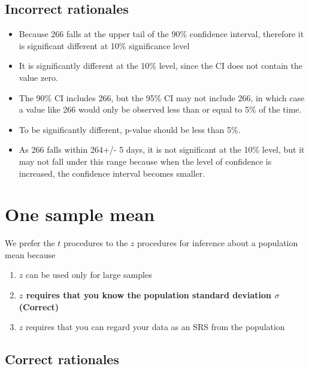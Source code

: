 \documentclass[letterpaper,9pt,twoside,printwatermark=false]{pinp}
\providecommand{\tightlist}{%
  \setlength{\itemsep}{0pt}\setlength{\parskip}{0pt}}
\begin{document}
\subsection{Incorrect rationales}\label{incorrect-rationales-3}

\begin{itemize}
\tightlist
\item
  Because 266 falls at the upper tail of the 90\% confidence interval,
  therefore it is significant different at 10\% significance level
\item
  It is significantly different at the 10\% level, since the CI does not
  contain the value zero.
\item
  The 90\% CI includes 266, but the 95\% CI may not include 266, in
  which case a value like 266 would only be observed less than or equal
  to 5\% of the time.
\item
  To be significantly different, p-value should be less than 5\%.
\item
  As 266 falls within 264+/- 5 days, it is not significant at the 10\%
  level, but it may not fall under this range because when the level of
  confidence is increased, the confidence interval becomes smaller.
\end{itemize}

\section{One sample mean}\label{one-sample-mean}

We prefer the \(t\) procedures to the \(z\) procedures for inference
about a population mean because

\begin{enumerate}
\def\labelenumi{\alph{enumi}.}
\tightlist
\item
  \(z\) can be used only for large samples
\item
  \textbf{\(z\) requires that you know the population standard deviation
  \(\sigma\) (Correct)}
\item
  \(z\) requires that you can regard your data as an SRS from the
  population
\end{enumerate}

\subsection{Correct rationales}\label{correct-rationales-4}
\end{document}
